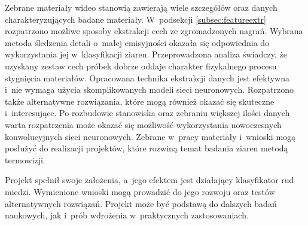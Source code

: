 Zebrane materiały wideo stanowią zawierają wiele szczegółów oraz danych
charakteryzujących badane materiały.
W~podsekcji \ref{subsec:featureextr} rozpatrzono możliwe sposoby ekstrakcji
cech ze zgromadzonych nagrań.
Wybrana metoda śledzenia detali o~małej emisyjności okazała się odpowiednia
do wykorzystania jej w~klasyfikacji ziaren.
Przeprowadzona analiza świadczy, że uzyskany zestaw cech próbek dobrze
oddaje charakter fizykalnego procesu stygnięcia materiałów.
Opracowana technika ekstrakcji danych jest efektywna i~nie wymaga użycia
skomplikowanych modeli sieci neuronowych.
Rozpatrzono także alternatywne rozwiązania, które mogą również okazać się
skuteczne i~interesujące.
Po rozbudowie stanowiska oraz zebraniu większej ilości danych warta 
rozpatrzenia może okazać się możliwość wykorzystania nowoczesnych
konwolucyjnych sieci neuronowych.
Zebrane w~pracy materiały i~wnioski mogą posłużyć do realizacji projektów,
które rozwiną temat badania ziaren metodą termowizji.

Projekt spełnił swoje założenia, a~jego efektem jest działający klasyfikator
rud miedzi.
Wymienione wnioski mogą prowadzić do jego rozwoju oraz testów alternatywnych
rozwiązań.
Projekt może być podstawą do dalszych badań naukowych, jak i~prób wdrożenia
w~praktycznych zastosowaniach.
